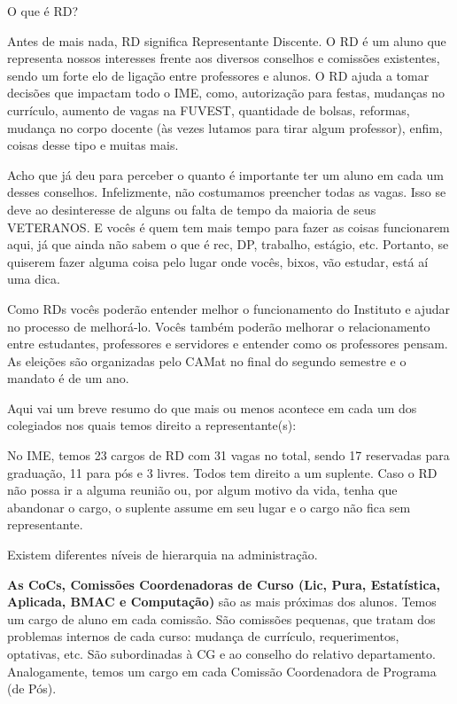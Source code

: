 \begin{secao}{O que é RD?}

Antes de mais nada, RD significa Representante Discente. O RD é um aluno que 
representa nossos interesses frente aos diversos conselhos e comissões existentes, 
sendo um forte elo de ligação entre professores e alunos. O RD ajuda a tomar 
decisões que impactam todo o IME, como, autorização para festas, mudanças 
no currículo, aumento de vagas na FUVEST, quantidade de bolsas, reformas, 
mudança no corpo docente (às vezes lutamos para tirar algum professor), 
enfim, coisas desse tipo e muitas mais.

Acho que já deu para perceber o quanto é importante ter um aluno em cada um desses
conselhos. Infelizmente, não costumamos preencher todas as vagas. Isso se 
deve ao desinteresse de alguns ou falta de tempo da maioria de seus VETERANOS. 
E vocês é quem tem mais tempo para fazer as coisas funcionarem aqui, já que 
ainda não sabem o que é rec, DP, trabalho, estágio, etc. Portanto, se quiserem 
fazer alguma coisa pelo lugar onde vocês, bixos, vão estudar, está aí
uma dica.

Como RDs vocês poderão entender melhor o funcionamento do Instituto e ajudar no 
processo de melhorá-lo. Vocês também poderão melhorar o relacionamento entre 
estudantes, professores e servidores e entender como os professores pensam. 
As eleições são organizadas pelo CAMat no final do segundo semestre e o 
mandato é de um ano.

Aqui vai um breve resumo do que mais ou menos acontece em cada um dos colegiados 
nos quais temos direito a representante(s):

No IME, temos 23 cargos de RD com 31 vagas no total, sendo 17 reservadas 
para graduação, 11 para pós e 3 livres. Todos tem direito a um suplente.
Caso o RD não possa ir a alguma reunião ou, por algum motivo da vida, tenha 
que abandonar o cargo, o suplente assume em seu lugar e o cargo não fica 
sem representante.

Existem diferentes níveis de hierarquia na administração.

{\bf As CoCs,
Comissões Coordenadoras de Curso (Lic, Pura, Estatística, Aplicada, BMAC e
Computação)} são as mais próximas dos alunos. Temos um cargo de aluno em cada
comissão. São comissões pequenas, que tratam dos problemas internos de cada
curso: mudança de currículo, requerimentos, optativas, etc. São subordinadas 
à CG e ao conselho do relativo departamento. Analogamente, temos um cargo em cada
Comissão Coordenadora de Programa (de Pós).


\end{secao}

